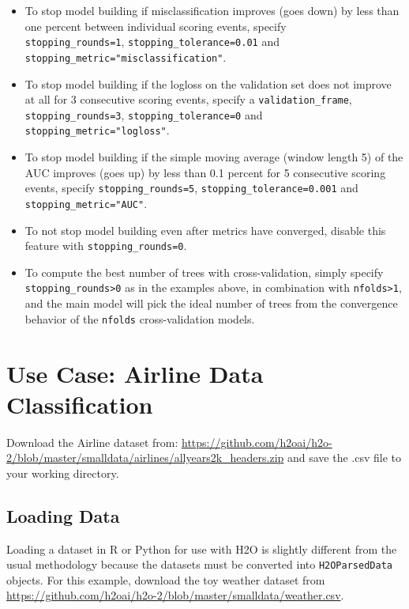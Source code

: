 \begin{itemize}
\item To stop model building if misclassification improves (goes down) by less than one percent between individual scoring events, specify \\\texttt{stopping\_rounds=1}, \texttt{stopping\_tolerance=0.01} and \\\texttt{stopping\_metric="misclassification"}.
\item To stop model building if the logloss on the validation set does not improve at all for 3 consecutive scoring events, specify a \texttt{validation\_frame}, \texttt{stopping\_rounds=3}, \texttt{stopping\_tolerance=0} and \\\texttt{stopping\_metric="logloss"}.
\item To stop model building if the simple moving average (window length 5) of the AUC improves (goes up) by less than 0.1 percent for 5 consecutive scoring events, specify \texttt{stopping\_rounds=5}, \texttt{stopping\_tolerance=0.001} and \texttt{stopping\_metric="AUC"}.
\item To not stop model building even after metrics have converged, disable this feature with \texttt{stopping\_rounds=0}.
\item To compute the best number of trees with cross-validation, simply specify \texttt{stopping\_rounds>0} as in the examples above, in combination with \texttt{nfolds>1}, and the main model will pick the ideal number of trees from the convergence behavior of the \texttt{nfolds} cross-validation models.
\end{itemize}

\section{Use Case: Airline Data Classification}
Download the Airline dataset from: {\url{https://github.com/h2oai/h2o-2/blob/master/smalldata/airlines/allyears2k_headers.zip}} and save the .csv file to your working directory. 

\subsection{Loading Data}

Loading a dataset in R or Python for use with H2O is slightly different from the usual methodology because the datasets must be converted into \texttt{H2OParsedData} objects. For this example, download the toy weather dataset from
{\url{https://github.com/h2oai/h2o-2/blob/master/smalldata/weather.csv}}.


